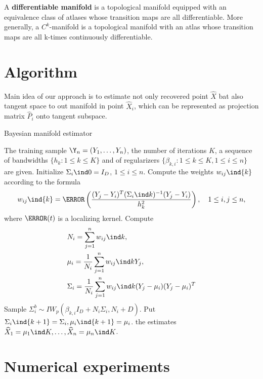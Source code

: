\documentclass[tablecaption=bottom,wcp]{jmlr} %
\begin{document}
A \textbf{differentiable manifold} is a topological manifold equipped with an equivalence class of atlases whose transition maps are all differentiable. More generally, a $C^k$-manifold is a topological manifold with an atlas whose transition maps are all k-times continuously differentiable.



\section{Algorithm}

Main idea of our approach is to estimate not only recovered point $\hat X$ bat also tangent space to out manifold in point $\hat X_i$, which can be represented as projection matrix $\hat P_i$ onto tangent subspace.

\begin{algorithm}[H]
	\caption{Bayesian manifold estimator}
	\label{algorithm}
	\begin{algorithmic}[1]
		\State The training sample $\Y_n = (Y_1, \dots, Y_n)$, the number of iterations 
		$K$, a sequence of bandwidths $\{h_k : 1 \leq k \leq K\}$ 
		and of regularizers $\{\beta_{k, i} : 1 \leq k \leq K, 1 \leq i \leq n\}$ are given.
		\State Initialize $\Sigma_i\ind 0 = I_D$, $1 \leq i \leq n$.
		\State Compute the weights \( w_{ij}\ind{k} \) according to the formula
		\[
			w_{ij}\ind{k} = \K \left( \frac{(Y_j - Y_i)^T(\Sigma_i\ind k)^{-1}(Y_j - 
			Y_i)}{h_k^2} \right), \quad 1 \leq i, j \leq n,
		\]
		where $\K(t)$ is a localizing kernel.
		\State Compute
		\begin{align*}
			&
			N_i = \sum\limits_{j=1}^n w_{ij}\ind k,
			\\&
			\mu_i = \frac1{N_i} \sum\limits_{j=1}^n w_{ij}\ind k Y_j,
			\\&
			\Sigma_i = \frac1{N_i} \sum\limits_{j=1}^n w_{ij}\ind k (Y_j - \mu_i)(Y_j - 
			\mu_i)^T
		\end{align*}
		\State Sample $\Sigma_i^b \sim IW_p(\beta_{k, i} I_D + N_i \Sigma_i, N_i + D)$.
		\State Put $\Sigma_i\ind{k+1} = \Sigma_i, \mu_i\ind{k+1} = \mu_i$.
		\EndFor
		\Return the estimates \( \widehat{X}_1 = \mu_1\ind K, \dots, 
		\widehat{X}_n = \mu_n\ind K \).
	\end{algorithmic}
\end{algorithm}

\section{Numerical experiments}
\end{document}
